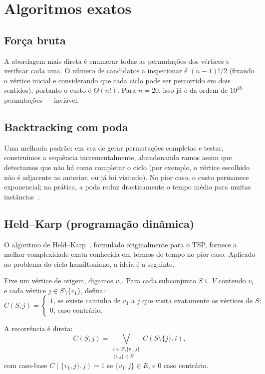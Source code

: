\documentclass[11pt,a4paper]{article}
\theoremstyle{definition}
\begin{document}
\section{Algoritmos exatos}

\subsection{Força bruta}

A abordagem mais direta é enumerar todas as permutações dos vértices e verificar cada uma. O número de candidatos a inspecionar é $(n-1)!/2$ (fixando o vértice inicial e considerando que cada ciclo pode ser percorrido em dois sentidos), portanto o custo é $\Theta(n!)$. Para $n = 20$, isso já é da ordem de $10^{18}$ permutações --- inviável.

\subsection{Backtracking com poda}

Uma melhoria padrão: em vez de gerar permutações completas e testar, construímos a sequência incrementalmente, abandonando ramos assim que detectamos que não há como completar o ciclo (por exemplo, o vértice escolhido não é adjacente ao anterior, ou já foi visitado). No pior caso, o custo permanece exponencial; na prática, a poda reduz drasticamente o tempo médio para muitas instâncias~\citep{knuth2011}.

\subsection{Held--Karp (programação dinâmica)}

O algoritmo de Held--Karp~\citep{heldkarp1962}, formulado originalmente para o TSP, fornece a melhor complexidade exata conhecida em termos de tempo no pior caso. Aplicado ao problema do ciclo hamiltoniano, a ideia é a seguinte.

Fixe um vértice de origem, digamos $v_1$. Para cada subconjunto $S \subseteq V$ contendo $v_1$ e cada vértice $j \in S \setminus \{v_1\}$, defina:
\[
  C(S, j) = \begin{cases}
    \text{1, se existe caminho de } v_1 \text{ a } j \text{ que visita exatamente os vértices de } S; \\
    \text{0, caso contrário.}
  \end{cases}
\]

A recorrência é direta:
\[
  C(S, j) = \bigvee_{\substack{i \in S \setminus \{v_1, j\} \\ \{i, j\} \in E}} C(S \setminus \{j\}, i),
\]
com caso-base $C(\{v_1, j\}, j) = 1$ se $\{v_1, j\} \in E$, e $0$ caso contrário.
\end{document}
